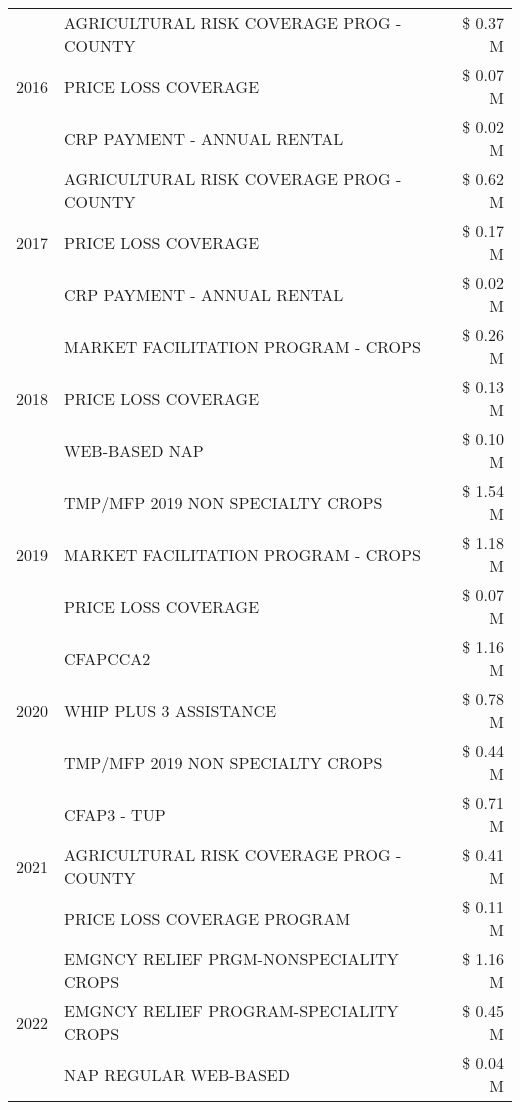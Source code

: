 \begin{tabular}{llr}
\cline{1-3}
\multirow[t]{3}{*}{2016} & AGRICULTURAL RISK COVERAGE PROG - COUNTY & \$ 0.37 M \\
 & PRICE LOSS COVERAGE & \$ 0.07 M \\
 & CRP PAYMENT - ANNUAL RENTAL & \$ 0.02 M \\
\cline{1-3}
\multirow[t]{3}{*}{2017} & AGRICULTURAL RISK COVERAGE PROG - COUNTY & \$ 0.62 M \\
 & PRICE LOSS COVERAGE & \$ 0.17 M \\
 & CRP PAYMENT - ANNUAL RENTAL & \$ 0.02 M \\
\cline{1-3}
\multirow[t]{3}{*}{2018} & MARKET FACILITATION PROGRAM - CROPS & \$ 0.26 M \\
 & PRICE LOSS COVERAGE & \$ 0.13 M \\
 & WEB-BASED NAP & \$ 0.10 M \\
\cline{1-3}
\multirow[t]{3}{*}{2019} & TMP/MFP 2019 NON SPECIALTY CROPS & \$ 1.54 M \\
 & MARKET FACILITATION PROGRAM - CROPS & \$ 1.18 M \\
 & PRICE LOSS COVERAGE & \$ 0.07 M \\
\cline{1-3}
\multirow[t]{3}{*}{2020} & CFAPCCA2 & \$ 1.16 M \\
 & WHIP PLUS 3 ASSISTANCE & \$ 0.78 M \\
 & TMP/MFP 2019 NON SPECIALTY CROPS & \$ 0.44 M \\
\cline{1-3}
\multirow[t]{3}{*}{2021} & CFAP3 - TUP & \$ 0.71 M \\
 & AGRICULTURAL RISK COVERAGE PROG - COUNTY & \$ 0.41 M \\
 & PRICE LOSS COVERAGE PROGRAM & \$ 0.11 M \\
\cline{1-3}
\multirow[t]{3}{*}{2022} & EMGNCY RELIEF PRGM-NONSPECIALITY CROPS & \$ 1.16 M \\
 & EMGNCY RELIEF PROGRAM-SPECIALITY CROPS & \$ 0.45 M \\
 & NAP REGULAR WEB-BASED & \$ 0.04 M \\
\cline{1-3}
\bottomrule
\end{tabular}
